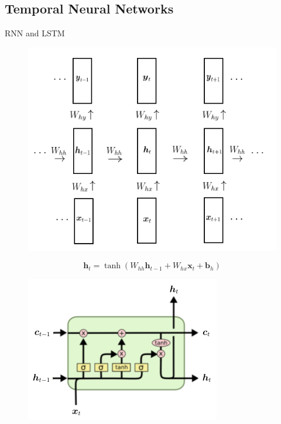 \documentclass{beamer}
\newcommand{\vect}[1]{\boldsymbol{#1}}
\theoremstyle{definition}
\let\oldfootnotesize\footnotesize
\renewcommand*{\footnotesize}{\oldfootnotesize\tiny}
\begin{document}
\subsection{Temporal Neural Networks}
\begin{frame}{RNN and LSTM}
  \begin{figure}
  \includegraphics[width=\textwidth]{../img/rnn_visual.png}
  \end{figure}
  {\footnotesize
  \[\vect h_t =\tanh\left(W_{hh}\vect h_{t-1} + W_{hx}\vect x_t + \vect b_h \right)\]
}
  \endminipage 
  \begin{figure}
    \includegraphics[width=.9\textwidth]{../img/lstm_visual.png}
  {\footnotesize
}
\end{figure}
\end{frame}
\end{document}
